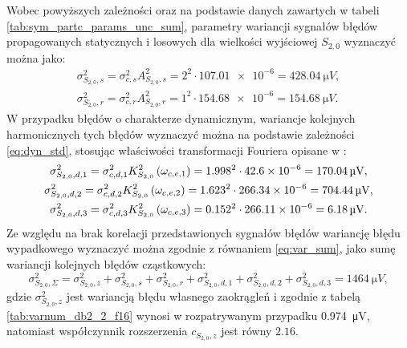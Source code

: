 Wobec powyższych zależności oraz na podstawie danych zawartych w tabeli \ref{tab:sym_partc_params_unc_sum}, parametry wariancji sygnałów błędów propagowanych statycznych i losowych dla wielkości wyjściowej $S_{2,0}$ wyznaczyć można jako:
\begin{gather}
\sigma_{S_{2,0},s}^{2} = \sigma_{c,s}^{2} A_{S_{2,0},s}^{2} = 2^{2} \cdot \num{107.01e-6} = \qty{428.04}{\micro V} \label{eq:sym_partd_output_var_stat_S_2_0}, \\
\sigma_{S_{2,0},r}^{2} = \sigma_{c,r}^{2} A_{S_{2,0},r}^{2} = 1^{2} \cdot \num{154.68e-6} = \qty{154.68}{\micro V} \label{eq:sym_partd_output_var_rand_S_2_0}.
\end{gather}
W przypadku błędów o charakterze dynamicznym, wariancje kolejnych harmonicznych tych błędów wyznaczyć można na podstawie zależności \eqref{eq:dyn_std}, stosując właściwości transformacji Fouriera opisane w \cite{oppenheim_sns}:
\begin{gather}
\sigma_{S_{2,0},d,1}^{2} = \sigma_{c,d,1}^{2} K_{S_{2,0}}^{2} \left(\omega_{c,e,1}\right) = {1.998}^{2} \cdot \num{42.6e-6} = \qty{170.04}{\micro V} \label{eq:sym_partd_output_var_dyn_1_S_2_0}, \\
\sigma_{S_{2,0},d,2}^{2} = \sigma_{c,d,2}^{2} K_{S_{2,0}}^{2}\left(\omega_{c,e,2}\right) = {1.623}^{2} \cdot \num{266.34e-6} = \qty{704.44}{\micro V} \label{eq:sym_partd_output_var_dyn_2_S_2_0}, \\
\sigma_{S_{2,0},d,3}^{2} = \sigma_{c,d,3}^{2} K_{S_{2,0}}^{2} \left(\omega_{c,e,3}\right) = {0.152}^{2} \cdot \num{266.11e-6} = \qty{6.18}{\micro V} \label{eq:sym_partd_output_var_dyn_3_S_2_0}.
\end{gather}
Ze względu na brak korelacji przedstawionych sygnałów błędów wariancję błędu wypadkowego wyznaczyć można zgodnie z równaniem \eqref{eq:var_sum}, jako sumę wariancji kolejnych błędów cząstkowych:
\begin{equation}
\sigma_{S_{2,0},\Sigma}^{2} = \sigma_{S_{2,0},z}^{2} + \sigma_{S_{2,0},s}^{2} + \sigma_{S_{2,0},r}^{2} + \sigma_{S_{2,0},d,1}^{2} + \sigma_{S_{2,0},d,2}^{2} + \sigma_{S_{2,0},d,3}^{2} = \qty{1464}{\micro V} \label{eq:sym_partd_output_var_sum_S_2_0},
\end{equation}
gdzie $\sigma_{S_{2,0},z}^{2}$ jest wariancją błędu własnego zaokrągleń i zgodnie z tabelą \ref{tab:varnum_db2_2_f16} wynosi w rozpatrywanym przypadku \qty{0.974}{\micro V}, natomiast współczynnik rozszerzenia $c_{S_{2,0},z}$ jest równy $2.16$.

